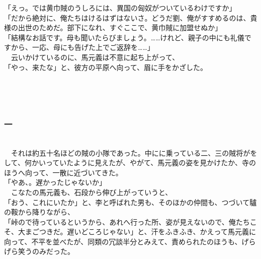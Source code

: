 \documentclass[
  paper=a5,
  fontsize=10pt,
  jafontsize=9.5pt,
  tate,                  %
  open_bracket_pos=nibu, %
]{jlreq}
\begin{document}
「えっ。では黄巾賊のうしろには、異国の匈奴がついているわけですか」\\


「だから絶対に、俺たちはけるはずはないさ。どうだ劉、俺がすすめるのは、貴様の出世のためだ。部下になれ、すぐここで、黄巾賊に加盟せぬか」\\


「結構なお話です。母も聞いたらびましょう。……けれど、親子の中にも礼儀ですから、一応、母にも告げた上でご返辞を……」\\


　云いかけているのに、馬元義は不意に起ち上がって、\\


「やっ、来たな」と、彼方の平原へ向って、眉に手をかざした。\\

\\

\subsection{}

\\

\subsubsection{一}

\\


　それは約五十名ほどの賊の小隊であった。中にに乗っている二、三の賊将がをして、何かいっていたように見えたが、やがて、馬元義の姿を見かけたか、寺のほうへ向って、一散に近づいてきた。\\


「やあ、。遅かったじゃないか」\\


　こなたの馬元義も、石段から伸び上がっていうと、\\


「おう、これにいたか」と、李と呼ばれた男も、そのほかの仲間も、つづいて驢の鞍から降りながら、\\


「峠ので待っているというから、あれへ行った所、姿が見えないので、俺たちこそ、大まごつきだ。遅いどころじゃない」と、汗をふきふき、かえって馬元義に向って、不平を並べたが、同類の冗談半分とみえて、責められたのほうも、げらげら笑うのみだった。\\
\end{document}
